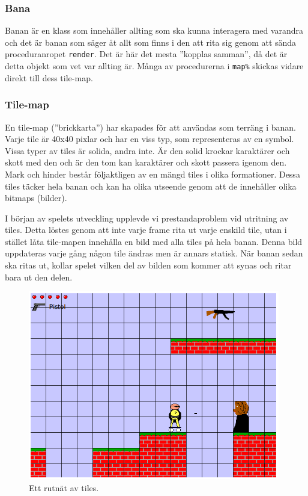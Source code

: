 \documentclass{scrartcl}
\newcommand{\code}[1]%
{\texttt{#1}}
\begin{document}
\subsubsection{Bana}
Banan är en klass som innehåller allting som ska kunna interagera med varandra och det är banan som säger åt allt som finns i den att rita sig genom att sända proceduranropet \code{render}. Det är här det mesta ''kopplas samman'', då det är detta objekt som vet var allting är. Många av procedurerna i \code{map\%} skickas vidare direkt till dess tile-map.



\subsubsection{Tile-map}
En tile-map (''brickkarta'') har skapades för att användas som terräng i banan. Varje tile är 40x40 pixlar och har en viss typ, som representeras av en symbol. Vissa typer av tiles är solida, andra inte. Är den solid krockar karaktärer och skott med den och är den tom kan karaktärer och skott passera igenom den. Mark och hinder består följaktligen av en mängd tiles i olika formationer. Dessa tiles täcker hela banan och kan ha olika utseende genom att de innehåller olika bitmaps (bilder).

I början av spelets utveckling upplevde vi prestandaproblem vid utritning av tiles. Detta löstes genom att inte varje frame rita ut varje enskild tile, utan i stället låta tile-mapen innehålla en bild med alla tiles på hela banan. Denna bild uppdateras varje gång någon tile ändras men är annars statisk. När banan sedan ska ritas ut, kollar spelet vilken del av bilden som kommer att synas och ritar bara ut den delen.

\begin{figure}[h!]
\centering
\includegraphics[width=11cm]{tilekoordinater}
\caption{Ett rutnät av tiles.}\label{tile-rutnat}
\end{figure}
\end{document}
